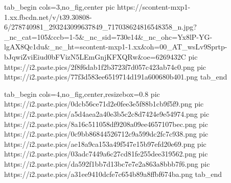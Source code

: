  
 
 
 
 

\ifcmt
  tab_begin cols=3,no_fig,center
     pic https://scontent-mxp1-1.xx.fbcdn.net/v/t39.30808-6/278740981_293243099637849_717038624816548358_n.jpg?_nc_cat=105&ccb=1-5&_nc_sid=730e14&_nc_ohc=Yx8lP-YG-lgAX8Qc1du&_nc_ht=scontent-mxp1-1.xx&oh=00_AT_wsLv9Sprtp-bJqwiZviEiud0bFVizN5LEmGnjKFXQRw&oe=6269432C
		 pic https://i2.paste.pics/2f8f6dab1f2b3723f7d057c423ab74c0.png
		 pic https://i2.paste.pics/77f3d583ee6519714d191a600680b401.png
  tab_end
\fi

\ifcmt
  tab_begin cols=4,no_fig,center,resizebox=0.8
     pic https://i2.paste.pics/0dcb56ce71d2e0fee3e5f88b1cb9f5f9.png
		 pic https://i2.paste.pics/a5d4aea2a40e3b5c2c8d7424e9e54974.png
		 pic https://i2.paste.pics/8a16c511058df9208a09ee4657107bec.png
		 pic https://i2.paste.pics/0c9bb86844526712c9a599dc2fc7c938.png
		 pic https://i2.paste.pics/ae18a9ca153a49f547e15b97efd20e69.png
		 pic https://i2.paste.pics/03adc7449a6c27cd81fe255dee319562.png
		 pic https://i2.paste.pics/da592f1bb7d13bc7e7e2a863a8bbb7f6.png
		 pic https://i2.paste.pics/a31ee9410dcfe7c654b89a8ffbf674ba.png
  tab_end
\fi
